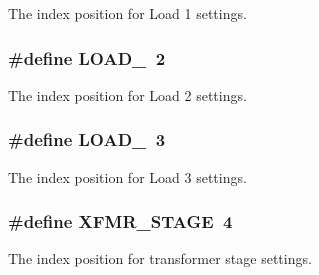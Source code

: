 The index position for Load 1 settings. \hypertarget{a00027_af7c1e96216e7b48160e5a03afe8ac807}{
\subsubsection[{L\-O\-A\-D\-\_\-2}]{\setlength{\rightskip}{0pt plus 5cm}\#define L\-O\-A\-D\-\_~2}}\label{a00027_af7c1e96216e7b48160e5a03afe8ac807}
The index position for Load 2 settings. \hypertarget{a00027_a2c862ec4115c4a016b61800609f236a7}{
\subsubsection[{L\-O\-A\-D\-\_\-3}]{\setlength{\rightskip}{0pt plus 5cm}\#define L\-O\-A\-D\-\_~3}}\label{a00027_a2c862ec4115c4a016b61800609f236a7}
The index position for Load 3 settings. \hypertarget{a00027_a873d529c32530ec23fbf76318011aeee}{
\subsubsection[{X\-F\-M\-R\-\_\-\-S\-T\-A\-G\-E}]{\setlength{\rightskip}{0pt plus 5cm}\#define X\-F\-M\-R\-\_\-\-S\-T\-A\-G\-E~4}}\label{a00027_a873d529c32530ec23fbf76318011aeee}
The index position for transformer stage settings. 

